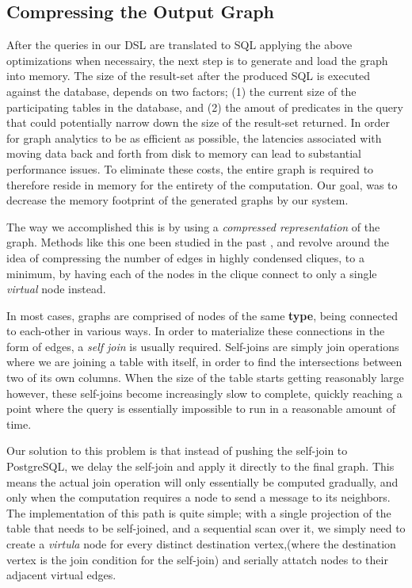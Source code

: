 \documentclass[11pt,letterpaper]{article}
\begin{document}
\subsection*{Compressing the Output Graph}

After the queries in our DSL are translated to SQL applying the above optimizations when necessairy, the next step is to generate and load the graph into memory. The size of the result-set after the produced SQL is executed against the database, depends on two factors; (1) the current size of the participating tables in the database, and (2) the amout of predicates in the query that could potentially narrow down the size of the result-set returned. In order for graph analytics to be as efficient as possible, the latencies associated with moving data back and forth from disk to memory can lead to substantial performance issues. To eliminate these costs, the entire graph is required to therefore reside in memory for the entirety of the computation. Our goal, was to decrease the memory footprint of the generated graphs by our system.

The way we accomplished this is by using a \textit{compressed representation} of the graph. Methods like this one been studied in the past \cite{compressedrep}, and revolve around the idea of compressing the number of edges in highly condensed cliques, to a minimum, by having each of the nodes in the clique connect to only a single \textit{virtual} node instead.

In most cases, graphs are comprised of nodes of the same \textbf{type}, being connected to each-other in various ways. In order to materialize these connections in the form of edges, a \textit{self join} is usually required. Self-joins are simply join operations where we are joining a table with itself, in order to find the intersections between two of its own columns. When the size of the table starts getting reasonably large however, these self-joins become increasingly slow to complete, quickly reaching a point where the query is essentially impossible to run in a reasonable amount of time.

Our solution to this problem is that instead of pushing the self-join to PostgreSQL, we delay the self-join and apply it directly to the final graph. This means the actual join operation will only essentially be computed gradually, and only when the computation requires a node to send a message to its neighbors. The implementation of this path is quite simple; with a single projection of the table that needs to be self-joined, and a sequential scan over it, we simply need to create a \textit{virtula} node for every distinct destination vertex,(where the destination vertex is the join condition for the self-join) and serially attatch nodes to their adjacent virtual edges.
\end{document}
